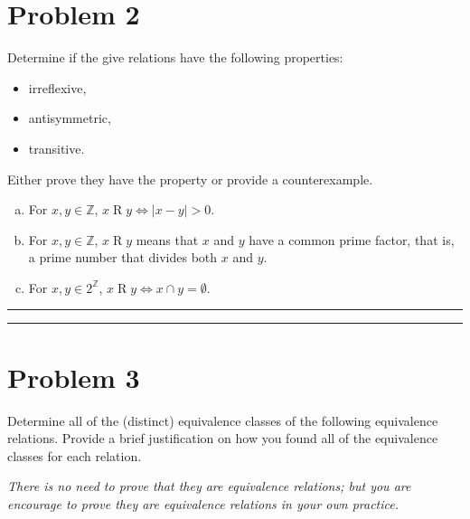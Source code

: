 \documentclass{article}
\theoremstyle{definition}
\newenvironment{solution}{\bigskip\hrule{\hfill}}{\bigskip\hrule{\hfill}} %
\begin{document}
\section*{Problem 2}
Determine if the give relations have the following properties:
\begin{itemize}
    \item irreflexive,
    \item antisymmetric,
    \item transitive.
\end{itemize}
Either prove they have the property or provide a counterexample.
\begin{enumerate}[a)] %
    \item For $x,y\in\mathbb{Z}$, $x\mathrel{R}y\Longleftrightarrow\left|x-y\right|>0$.
    \item For $x,y\in\mathbb{Z}$, $x\mathrel{R}y$ means that $x$ and $y$ have a common prime factor, that is, a prime number that divides both $x$ and $y$.
    \item For $x,y\in 2^{\mathbb{Z}}$, $x\mathrel{R}y\Longleftrightarrow x\cap y=\emptyset$.
\end{enumerate}
\begin{solution}


\end{solution}


\newpage


\section*{Problem 3}
Determine all of the (distinct) equivalence classes of the following equivalence relations. Provide a brief justification on how you found all of the equivalence classes for each relation. \medskip

\emph{There is no need to prove that they are equivalence relations; but you are encourage to prove they are equivalence relations in your own practice.}
\end{document}
